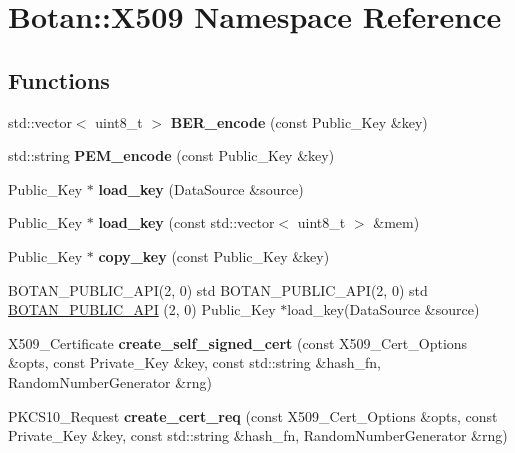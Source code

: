 \hypertarget{namespace_botan_1_1_x509}{}\section{Botan\+:\+:X509 Namespace Reference}
\label{namespace_botan_1_1_x509}
\subsection*{Functions}
\begin{DoxyCompactItemize}
\item 
\mbox{\label{namespace_botan_1_1_x509_ab91dec69998c75add40509cd39c41909}} 
std\+::vector$<$ uint8\+\_\+t $>$ {\bfseries B\+E\+R\+\_\+encode} (const Public\+\_\+\+Key \&key)
\item 
\mbox{\label{namespace_botan_1_1_x509_af5a907ded1245bb777fea76a04fa8af6}} 
std\+::string {\bfseries P\+E\+M\+\_\+encode} (const Public\+\_\+\+Key \&key)
\item 
\mbox{\label{namespace_botan_1_1_x509_a4fcadeecf849a4d69737d23d761818fe}} 
Public\+\_\+\+Key $\ast$ {\bfseries load\+\_\+key} (Data\+Source \&source)
\item 
\mbox{\label{namespace_botan_1_1_x509_a66ab995f1f74fc24e9b60237f7fc03ec}} 
Public\+\_\+\+Key $\ast$ {\bfseries load\+\_\+key} (const std\+::vector$<$ uint8\+\_\+t $>$ \&mem)
\item 
\mbox{\label{namespace_botan_1_1_x509_a2d472ccf016d93553b3ec41a6c2f7069}} 
Public\+\_\+\+Key $\ast$ {\bfseries copy\+\_\+key} (const Public\+\_\+\+Key \&key)
\item 
B\+O\+T\+A\+N\+\_\+\+P\+U\+B\+L\+I\+C\+\_\+\+A\+PI(2, 0) std B\+O\+T\+A\+N\+\_\+\+P\+U\+B\+L\+I\+C\+\_\+\+A\+PI(2, 0) std \mbox{\hyperlink{namespace_botan_1_1_x509_af5ed8fe1a15fe04e788faea89f386728}{B\+O\+T\+A\+N\+\_\+\+P\+U\+B\+L\+I\+C\+\_\+\+A\+PI}} (2, 0) Public\+\_\+\+Key $\ast$load\+\_\+key(Data\+Source \&source)
\item 
\mbox{\label{namespace_botan_1_1_x509_a9aa3d7576a991f8204dd8306a434dcc6}} 
X509\+\_\+\+Certificate {\bfseries create\+\_\+self\+\_\+signed\+\_\+cert} (const X509\+\_\+\+Cert\+\_\+\+Options \&opts, const Private\+\_\+\+Key \&key, const std\+::string \&hash\+\_\+fn, Random\+Number\+Generator \&rng)
\item 
\mbox{\label{namespace_botan_1_1_x509_a38d606bf9311a22020423d8e2f2f76d2}} 
P\+K\+C\+S10\+\_\+\+Request {\bfseries create\+\_\+cert\+\_\+req} (const X509\+\_\+\+Cert\+\_\+\+Options \&opts, const Private\+\_\+\+Key \&key, const std\+::string \&hash\+\_\+fn, Random\+Number\+Generator \&rng)
\end{DoxyCompactItemize}
